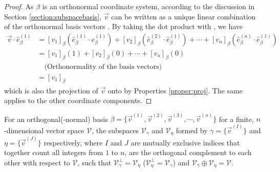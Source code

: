 \begin{proof}
As $\beta$ is an orthonormal coordinate system, according to the discussion in Section \ref{section:subspacebasis}, $\vec{v}$ can be written as a unique linear combination of the orthonormal basis vectors . By taking the dot product with , we have
\begin{align*}
\vec{v} \cdot \hat{e}_\beta^{(1)} &= [v_1]_\beta (\hat{e}_\beta^{(1)} \cdot \hat{e}_\beta^{(1)}) + [v_2]_\beta (\hat{e}_\beta^{(2)} \cdot \hat{e}_\beta^{(1)}) + \cdots + [v_n]_\beta (\hat{e}_\beta^{(n)} \cdot \hat{e}_\beta^{(1)}) \\
&= [v_1]_\beta (1) + [v_2]_\beta (0) + \cdots + [v_n]_\beta (0) \\
&\quad \text{(Orthonormality of the basis vectors)} \\
&= [v_1]_\beta
\end{align*}
which is also the projection of $\vec{v}$ onto  by Properties \ref{proper:proj}. The same applies to the other coordinate components.
\end{proof}
\begin{proper}
\label{proper:orthodirectsum}
For an orthogonal(-normal) basis $\mathcal{\beta} = \{\vec{v}^{(1)}, \vec{v}^{(2)}, \vec{v}^{(3)}, \cdots, \allowbreak \vec{v}^{(n)}\}$ for a finite, $n$-dimensional vector space $\mathcal{V}$, the subspaces $\mathcal{V}_\gamma$ and $\mathcal{V}_\eta$ formed by $\mathcal{\gamma} = \{\vec{v}^{(I)}\}$ and $\mathcal{\eta} = \{\vec{v}^{(J)}\}$ respectively, where $I$ and $J$ are mutually exclusive indices that together count all integers from $1$ to $n$, are the orthogonal complement to each other with respect to $\mathcal{V}$, such that $\mathcal{V}_\gamma^\perp = \mathcal{V}_\eta$ ($\mathcal{V}_\eta^\perp = \mathcal{V}_\gamma$) and $\mathcal{V}_\gamma \oplus \mathcal{V}_\eta = \mathcal{V}$.
\end{proper}


